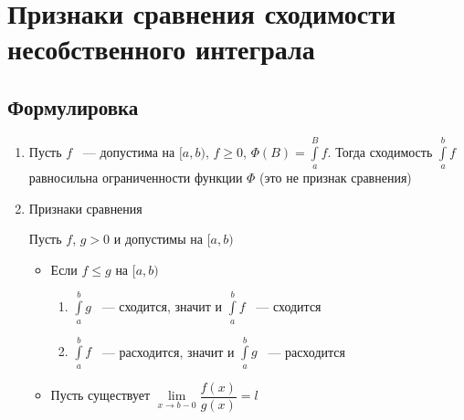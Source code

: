 \documentclass{article}
\begin{document}
    \newpage
    
    \section{Признаки сравнения сходимости несобственного интеграла}
    
        \subsection{Формулировка}
        
            \begin{enumerate}
            
                \item Пусть $f$ ~--- допустима на $[a, b)$, $f \geq 0$, $\Phi(B) = \int\limits^B_a f$. Тогда сходимость $\int\limits^b_a f$ равносильна ограниченности функции $\Phi$ (это не признак сравнения)
                
                \item Признаки сравнения
                
                    Пусть $f$, $g > 0$ и допустимы на $[a, b)$
                    
                    \begin{itemize}
                    
                        \item
                        
                            Если $f \leq g$ на $[a, b)$
                            
                            \begin{enumerate}
                            
                                \item $\int\limits^b_a g$ ~--- сходится, значит и $\int\limits^b_a f$ ~--- сходится
                                
                                \item $\int\limits^b_a f$ ~--- расходится, значит и $\int\limits^b_a g$ ~--- расходится
                                
                            \end{enumerate}
                        
                        \item Пусть существует $\lim\limits_{x \rightarrow b - 0} \dfrac{f(x)}{g(x)} = l$
                        

\end{itemize}
\end{enumerate}
\end{document}
